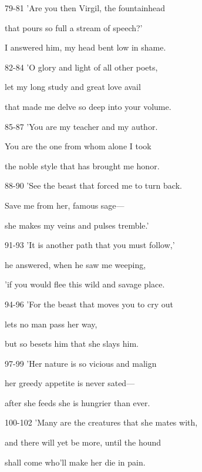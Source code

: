 \documentclass[oneside]{ctexbook}
\begin{document}
\begin{mytext}{79-81}
'Are you then Virgil, the fountainhead

that pours so full a stream of speech?'

I answered him, my head bent low in shame.
\end{mytext}

\begin{mytext}{82-84}
'O glory and light of all other poets,

let my long study and great love avail

that made me delve so deep into your volume.
\end{mytext}

\begin{mytext}{85-87}
'You are my teacher and my author.

You are the one from whom alone I took

the noble style that has brought me honor.
\end{mytext}

\begin{mytext}{88-90}
'See the beast that forced me to turn back.

Save me from her, famous sage—

she makes my veins and pulses tremble.'
\end{mytext}

\begin{mytext}{91-93}
'It is another path that you must follow,'

he answered, when he saw me weeping,

'if you would flee this wild and savage place.
\end{mytext}

\begin{mytext}{94-96}
'For the beast that moves you to cry out

lets no man pass her way,

but so besets him that she slays him.
\end{mytext}

\begin{mytext}{97-99}
'Her nature is so vicious and malign

her greedy appetite is never sated—

after she feeds she is hungrier than ever.
\end{mytext}

\begin{mytext}{100-102}
'Many are the creatures that she mates with,

and there will yet be more, until the hound

shall come who'll make her die in pain.
\end{mytext}
\end{document}
